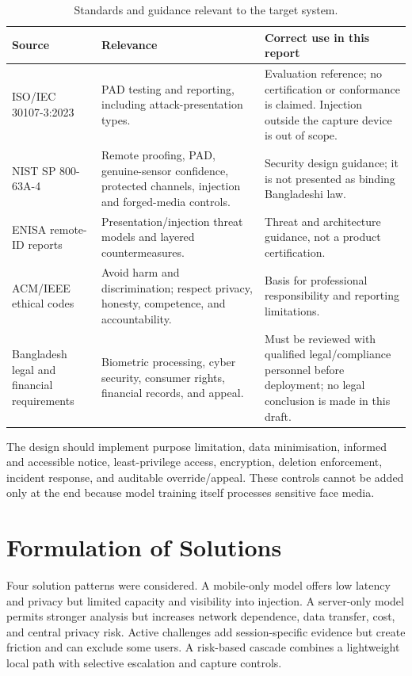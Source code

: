 \begin{table}[H]
\centering
\caption{Standards and guidance relevant to the target system.}
\label{tab:standards}
\begin{tabularx}{\textwidth}{@{}p{33mm}Y Y@{}}
\toprule
Source & Relevance & Correct use in this report \\
\midrule
ISO/IEC 30107-3:2023 \cite{iso30107} & PAD testing and reporting, including
attack-presentation types. & Evaluation reference; no certification or
conformance is claimed. Injection outside the capture device is out of scope. \\
NIST SP 800-63A-4 \cite{nist80063a4} & Remote proofing, PAD, genuine-sensor
confidence, protected channels, injection and forged-media controls. & Security
design guidance; it is not presented as binding Bangladeshi law. \\
ENISA remote-ID reports \cite{enisa2022,enisa2024} & Presentation/injection threat
models and layered countermeasures. & Threat and architecture guidance, not a
product certification. \\
ACM/IEEE ethical codes \cite{acmcode,ieeecode} & Avoid harm and discrimination;
respect privacy, honesty, competence, and accountability. & Basis for professional
responsibility and reporting limitations. \\
Bangladesh legal and financial requirements & Biometric processing, cyber
security, consumer rights, financial records, and appeal. & Must be reviewed with
qualified legal/compliance personnel before deployment; no legal conclusion is
made in this draft. \\
\bottomrule
\end{tabularx}
\end{table}

The design should implement purpose limitation, data minimisation, informed and
accessible notice, least-privilege access, encryption, deletion enforcement,
incident response, and auditable override/appeal. These controls cannot be added
only at the end because model training itself processes sensitive face media.

\section{Formulation of Solutions}

Four solution patterns were considered. A mobile-only model offers low latency
and privacy but limited capacity and visibility into injection. A server-only
model permits stronger analysis but increases network dependence, data transfer,
cost, and central privacy risk. Active challenges add session-specific evidence
but create friction and can exclude some users. A risk-based cascade combines a
lightweight local path with selective escalation and capture controls.

